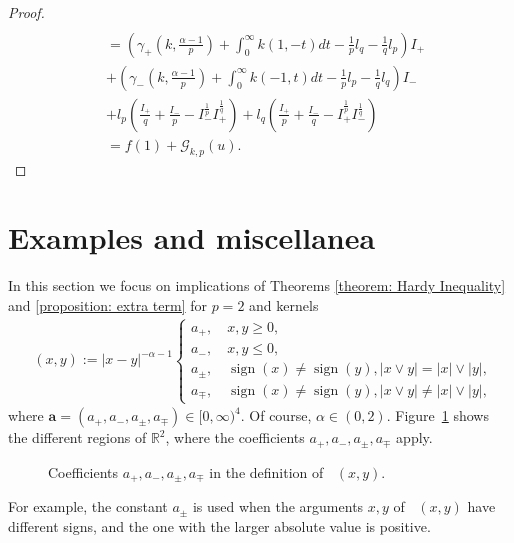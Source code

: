\documentclass[12pt, a4paper]{amsart}
\DeclareMathOperator{\sign}{sign}
\DeclareMathOperator{\Mass}{\nu_{\alpha}}
\DeclareMathOperator{\Masss}{\nu_{\alpha}^{(\boldsymbol{a})}}
\newcommand{\R}{\mathbb{R}}
\begin{document}
\begin{proof}
\begin{align*}
    \\
    &=\left( \gamma_{+}\left(k, \frac{\alpha - 1}{p}\right) + \int_{0}^{\infty}k(1, -t)dt - \frac{1}{p}l_q - \frac{1}{q}l_p \right)I_+
    \\
    &+\left( \gamma_{-}\left(k, \frac{\alpha - 1}{p}\right) + \int_{0}^{\infty}k(-1, t)dt - \frac{1}{p}l_p - \frac{1}{q}l_q \right)I_-
    \\
    &+ l_p\left( \frac{I_+}{q} + \frac{I_-}{p} -I_{-}^{\frac{1}{p}}I_{+}^{\frac{1}{q}} \right) + l_q\left( \frac{I_+}{p} + \frac{I_-}{q} -I_{+}^{\frac{1}{p}}I_{-}^{\frac{1}{q}} \right)
    \\
    &= f(1) + \mathcal{G}_{k, p}(u).
\end{align*}
\end{proof}

\section{Examples and miscellanea}
\label{sec:Example}
In this section we focus on implications of Theorems
 \cref{theorem: Hardy Inequality} and \cref{proposition: extra term} for $p = 2$ and kernels
 \begin{align*}
     \Masss(x, y) := |x - y|^{- \alpha - 1}\begin{cases}
         a_+, \quad x, y \geq 0,
         \\
         a_-, \quad x, y \leq 0,
         \\
         a_{\pm}, \quad \sign(x) \neq \sign(y), |x \lor y| =|x| \lor |y|,
         \\
         a_{\mp}, \quad \sign(x) \neq \sign(y), |x \lor y| \neq |x| \lor |y|,
     \end{cases}
\end{align*}
where $\boldsymbol{a} = (a_+, a_-, a_{\pm}, a_{\mp}) \in [0, \infty)^4$. Of course, $\alpha \in (0, 2)$. Figure~\ref{f.apm} shows the different regions of  $\R^2$, where the coefficients $a_+, a_-, a_\pm, a_\mp$ apply.
\begin{figure}[h]
\centering
Coefficients $a_+, a_-, a_\pm, a_\mp$ in the definition of $\Mass(x,y)$.
\caption{}
\label{f.apm}
\end{figure}
For example, the constant $a_\pm$ is used when the arguments $x,y$ of $\Mass(x,y)$ have different signs, and the one with the larger absolute value is positive.
\end{document}
